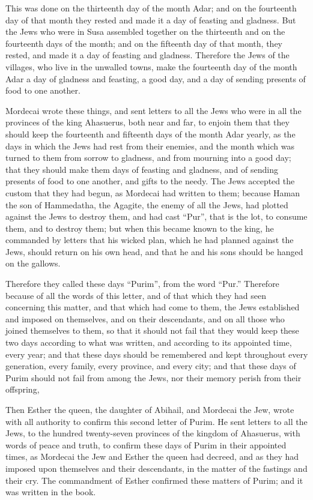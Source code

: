 {\par }{\PP {}This was done on the thirteenth day of the month Adar; and on the fourteenth day of that month they rested and made it a day of feasting and gladness.
But the Jews who were in Susa assembled together on the thirteenth and on the fourteenth days of the month; and on the fifteenth day of that month, they rested, and made it a day of feasting and gladness.
Therefore the Jews of the villages, who live in the unwalled towns, make the fourteenth day of the month Adar a day of gladness and feasting, a good day, and a day of sending presents of food to one another.
\par }{\PP {}Mordecai wrote these things, and sent letters to all the Jews who were in all the provinces of the king Ahasuerus, both near and far,
to enjoin them that they should keep the fourteenth and fifteenth days of the month Adar yearly,
as the days in which the Jews had rest from their enemies, and the month which was turned to them from sorrow to gladness, and from mourning into a good day; that they should make them days of feasting and gladness, and of sending presents of food to one another, and gifts to the needy.
The Jews accepted the custom that they had begun, as Mordecai had written to them;
because Haman the son of Hammedatha, the Agagite, the enemy of all the Jews, had plotted against the Jews to destroy them, and had cast “Pur”, that is the lot, to consume them, and to destroy them;
but when this became known to the king, he commanded by letters that his wicked plan, which he had planned against the Jews, should return on his own head, and that he and his sons should be hanged on the gallows.
\par }{\PP {}Therefore they called these days “Purim”, from the word “Pur.” Therefore because of all the words of this letter, and of that which they had seen concerning this matter, and that which had come to them,
the Jews established and imposed on themselves, and on their descendants, and on all those who joined themselves to them, so that it should not fail that they would keep these two days according to what was written, and according to its appointed time, every year;
and that these days should be remembered and kept throughout every generation, every family, every province, and every city; and that these days of Purim should not fail from among the Jews, nor their memory perish from their offspring,
\par }{\PP {}Then Esther the queen, the daughter of Abihail, and Mordecai the Jew, wrote with all authority to confirm this second letter of Purim.
He sent letters to all the Jews, to the hundred twenty-seven provinces of the kingdom of Ahasuerus, with words of peace and truth,
to confirm these days of Purim in their appointed times, as Mordecai the Jew and Esther the queen had decreed, and as they had imposed upon themselves and their descendants, in the matter of the fastings and their cry.
The commandment of Esther confirmed these matters of Purim; and it was written in the book.

}
